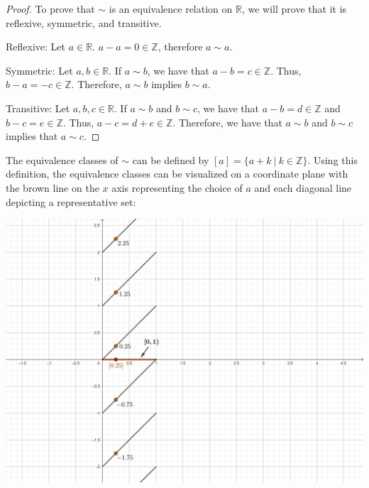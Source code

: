 \documentclass[12pt,reqno]{article}
\newcommand{\R}{\mathbb{R}}
\newcommand{\Z}{\mathbb{Z}}
\theoremstyle{definition}
\begin{document}
\begin{proof}
    To prove that $\sim$ is an equivalence relation on $\R$, we will prove that it is reflexive, symmetric, and transitive.
    
    Reflexive: Let $a\in\R$. $a-a=0\in\Z$, therefore $a\sim a$.

    Symmetric: Let $a,b\in\R$. If $a\sim b$, we have that $a-b = c \in\Z$. Thus, $b-a=-c\in\Z$. Therefore, $a\sim b$ implies $b\sim a$.

    Transitive: Let $a,b,c\in\R$. If $a\sim b$ and $b\sim c$, we have that $a-b=d\in\Z$ and $b-c=e\in\Z$. Thus, $a-c=d+e\in\Z$. Therefore, we have that $a\sim b$ and $b\sim c$ implies that $a\sim c$.
\end{proof}

The equivalence classes of $\sim$ can be defined by $\left[a\right] = \{a + k\ |\ k\in\Z\}$. Using this definition, the equivalence classes can be visualized on a coordinate plane with the brown line on the $x$ axis representing the choice of $a$ and each diagonal line depicting a representative set:

\includegraphics[scale=2.35]{MATH 1530 P1.png}
\end{document}
